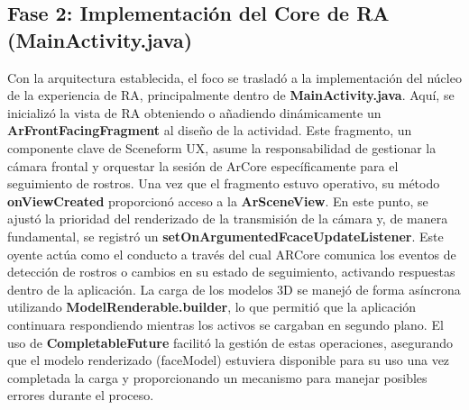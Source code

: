 \documentclass[conference]{IEEEtran}
\begin{document}
    \subsection{Fase 2: Implementación del Core de RA (MainActivity.java)}

        Con la arquitectura establecida, el foco se trasladó a la implementación del núcleo de la experiencia de RA, principalmente dentro de \textbf{MainActivity.java}. Aquí, se inicializó la vista de RA obteniendo o añadiendo dinámicamente un \textbf{ArFrontFacingFragment} al diseño de la actividad. Este fragmento, un componente clave de Sceneform UX, asume la responsabilidad de gestionar la cámara frontal y orquestar la sesión de ArCore específicamente para el seguimiento de rostros. Una vez que el fragmento estuvo operativo, su método \textbf{onViewCreated} proporcionó acceso a la \textbf{ArSceneView}. En este punto, se ajustó la prioridad del renderizado de la transmisión de la cámara y, de manera fundamental, se registró un \textbf{setOnArgumentedFcaceUpdateListener}. Este oyente actúa como el conducto a través del cual ARCore comunica los eventos de detección de rostros o cambios en su estado de seguimiento, activando respuestas dentro de la aplicación. La carga de los modelos 3D se manejó de forma asíncrona utilizando \textbf{ModelRenderable.builder}, lo que permitió que la aplicación continuara respondiendo mientras los activos se cargaban en segundo plano. El uso de \textbf{CompletableFuture} facilitó la gestión de estas operaciones, asegurando que el modelo renderizado (faceModel) estuviera disponible para su uso una vez completada la carga y proporcionando un mecanismo para manejar posibles errores durante el proceso.\\
\end{document}
